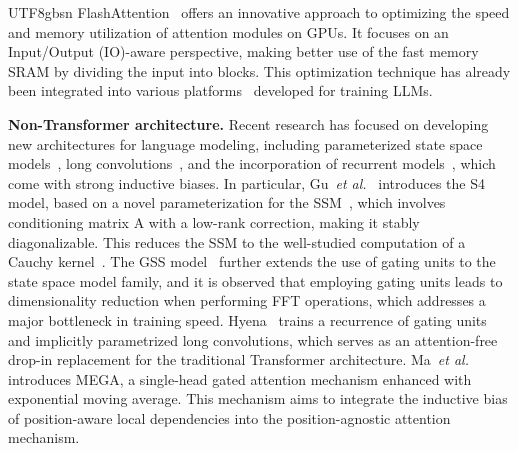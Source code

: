 \documentclass[10pt,journal,compsoc]{IEEEtran}
\newcommand{\etal}{\emph{et al.}}
\newcommand{\<}{\left\langle}
\renewcommand{\>}{\right\rangle}
\newcommand{\1}{\mathbbm{1}}
\begin{document}
\begin{CJK}{UTF8}{gbsn}
FlashAttention~\cite{dao2022flashattention} offers an innovative approach to optimizing the speed and memory utilization of attention modules on GPUs. It focuses on an Input/Output (IO)-aware perspective, making better use of the fast memory SRAM by dividing the input into blocks. This optimization technique has already been integrated into various platforms~\cite{rasley2020deepspeed,shoeybi2019megatron,paszke2019pytorch,li2023colossal,wolf2019huggingface} developed for training LLMs.

\noindent\textbf{Non-Transformer architecture.}
Recent research has focused on developing new architectures for language modeling, including parameterized state space models~\cite{gu2021efficiently,mehta2022long,dao2022hungry,gupta2022diagonal}, long convolutions~\cite{poli2023hyena}, and the incorporation of recurrent models~\cite{dai2019Transformer,martins2021infty,sun2023retentive,ma2022mega}, which come with strong inductive biases.
In particular, Gu~\etal~\cite{gu2021efficiently} introduces the S4 model, based on a novel parameterization for the SSM~\cite{chen1984linear,gu2020hippo}, which involves conditioning matrix A with a low-rank correction, making it stably diagonalizable. This reduces the SSM to the well-studied computation of a Cauchy kernel~\cite{pan2017fast}. The GSS model~\cite{mehta2022long} further extends the use of gating units to the state space model family, and it is observed that employing gating units leads to dimensionality reduction when performing FFT operations, which addresses a major bottleneck in training speed.
Hyena~\cite{poli2023hyena} trains a recurrence of gating units and implicitly parametrized long convolutions, which serves as an attention-free drop-in replacement for the traditional Transformer architecture.
Ma~\etal~\cite{ma2022mega} introduces MEGA, a single-head gated attention mechanism enhanced with exponential moving average. This mechanism aims to integrate the inductive bias of position-aware local dependencies into the position-agnostic attention mechanism.


\end{CJK}
\end{document}
